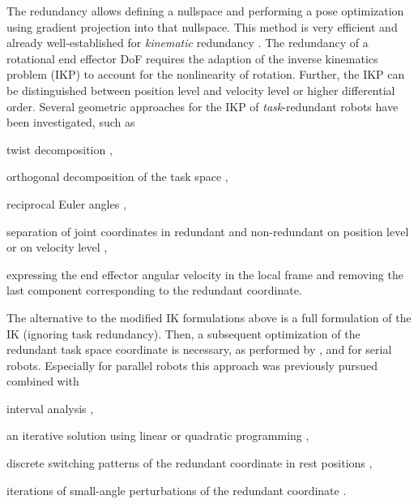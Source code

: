 \documentclass[a4paper,twoside]{article}
\begin{document}
The redundancy allows defining a nullspace and performing a pose optimization using gradient projection into that nullspace.
This method is very efficient and already well-established for \emph{kinematic} redundancy \cite{NakamuraHanYos1987,ChiaveriniOriWal2008}.
The redundancy of a rotational end effector DoF requires the adaption of the inverse kinematics problem (IKP) to account for the nonlinearity of rotation.
Further, the IKP can be distinguished between position level and velocity level or higher differential order. %
Several geometric approaches for the IKP of \emph{task}-redundant robots have been investigated, such as 
\begin{compactitem}
\item twist decomposition \cite{HuoBar2008},
\item orthogonal decomposition of the task space \cite{LegerAng2016,CorinaldiAngCal2016},%
\item reciprocal Euler angles %
 \cite{SchapplerTapOrt2019},
\item separation of joint coordinates in redundant and non-redundant on position level \cite{Ozgoren2013} or on velocity level \cite{ReiterMueGat2018},
\item expressing the end effector angular velocity in the local frame and removing the last component \cite{Zlajpah2017,ReiterMueGat2018} corresponding to the redundant coordinate.
\end{compactitem}

The alternative to the modified IK formulations above is a full formulation of the IK (ignoring task redundancy).
Then, a subsequent optimization of the redundant task space coordinate is necessary, as performed by \cite{ZhuQuCaoYan2013}, \cite{GuoDonKe2015} and \cite{MousaviGagBouRay2018} for serial robots.
Especially for parallel robots this approach was previously pursued combined with
\begin{compactitem}
\item interval analysis \cite{MerletPerDan2000}, 
\item an iterative solution using linear or quadratic programming \cite{OenWan2007},
\item discrete switching patterns of the redundant coordinate in rest positions \cite{KotlarskiDoHeiOrt2010},
\item iterations of small-angle perturbations of the redundant coordinate \cite{GaoCheGaoXia2019}.
\end{compactitem}
\end{document}
